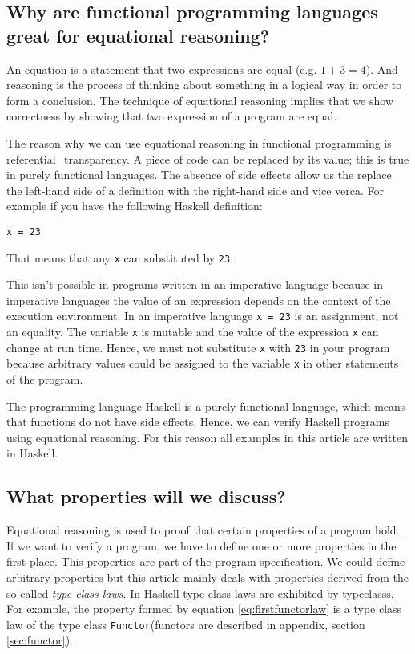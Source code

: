 \subsection{Why are functional programming languages great for equational reasoning?}

An equation is a statement that two expressions are equal (e.g. $1 + 3 = 4$). And reasoning is the process of thinking about something in a logical way in order to form a conclusion. The technique of equational reasoning implies that we show correctness by showing that two expression of a program are equal. 

The reason why we can use equational reasoning in functional programming is \gls{referential_transparency}. A piece of code can be replaced by its value; this is true in purely functional languages. The absence of side effects allow us the replace the left-hand side of a definition with the right-hand side and vice verca. For example if you have the following Haskell definition:
\begin{verbatim}
x = 23
\end{verbatim}
That means that any \verb|x| can substituted by \verb|23|.

This isn't possible in programs written in an imperative language because in imperative languages the value of an expression depends on the context of the execution environment. In an imperative language \verb|x = 23| is an assignment, not an equality. The variable \verb|x| is mutable and the value of the expression \verb|x| can change at run time. Hence, we must not substitute \verb|x| with \verb|23| in your program because arbitrary values could be assigned to the variable \verb|x| in other statements of the program.

The programming language Haskell is a purely functional language, which means that functions do not have side effects. Hence, we can verify Haskell programs using equational reasoning. For this reason all examples in this article are written in Haskell.

\subsection{What properties will we discuss?}

Equational reasoning is used to proof that certain properties of a program hold. If we want to verify a program, we have to define one or more properties in the first place. This properties are part of the program specification. We could define arbitrary properties but this article mainly deals with properties derived from the so called \emph{type class laws}. In Haskell type class laws are exhibited by \glspl{typeclass}. For example, the property formed by equation \ref{eq:firstfunctorlaw} is a type class law of the type class \verb|Functor|(functors are described in appendix, section \ref{sec:functor}).

